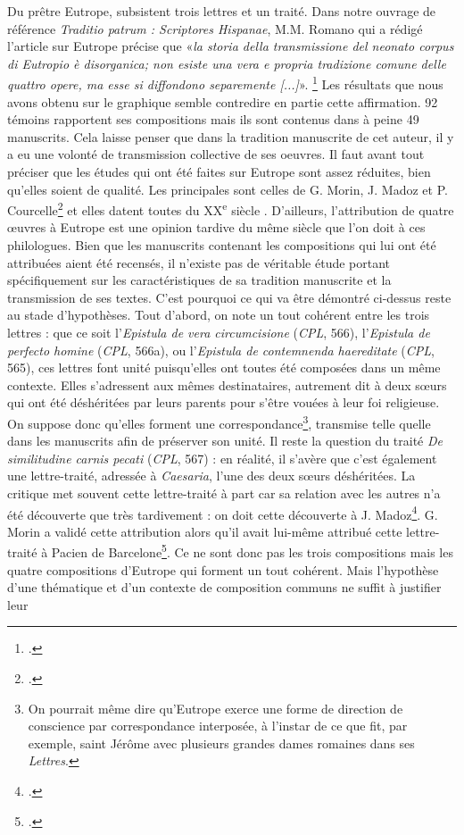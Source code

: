 \documentclass[a4paper,twoside,12pt]{book}
\begin{document}
Du prêtre Eutrope, subsistent trois lettres et un traité. Dans notre ouvrage de référence \textit{Traditio patrum : Scriptores Hispanae}, M.M. Romano qui a rédigé l’article sur Eutrope précise que «\textit{la storia della transmissione del neonato corpus di Eutropio è disorganica; non esiste una vera e propria tradizione comune delle quattro opere, ma esse si diffondono
	separemente [...]}». \footcite[p. 388]{TradPat} Les résultats que nous avons obtenu sur le graphique semble contredire en partie cette affirmation. 92 témoins rapportent ses compositions mais ils sont contenus dans à peine 49 manuscrits. Cela laisse penser que dans la tradition manuscrite de cet auteur, il y a eu une volonté de transmission collective de ses oeuvres. Il faut avant tout préciser que les études qui ont été faites sur Eutrope sont assez réduites, bien qu’elles soient de qualité.  Les principales sont
celles de G. Morin, J. Madoz et P. Courcelle\footcite{Morin, Madoz, Courcelle}
et elles datent toutes du XX\textsuperscript{e} siècle
. D’ailleurs, l’attribution de quatre œuvres à Eutrope est une opinion tardive du même siècle que l’on doit à ces philologues. Bien que les manuscrits contenant les compositions qui lui ont été attribuées aient été recensés, il n’existe pas de véritable étude portant spécifiquement sur les caractéristiques de sa tradition manuscrite et la transmission de ses textes. C’est pourquoi ce qui va être démontré ci-dessus reste au stade d’hypothèses. Tout d’abord, on note un tout cohérent entre les trois lettres : que ce soit l’\textit{Epistula de vera circumcisione} (\textit{CPL}, 566), l’\textit{Epistula de perfecto homine} (\textit{CPL}, 566a), ou l’\textit{Epistula de contemnenda haereditate} (\textit{CPL}, 565), ces lettres font unité puisqu’elles ont toutes été composées dans un même contexte. Elles s’adressent aux mêmes destinataires, autrement dit à deux sœurs qui ont été déshéritées par leurs parents pour s’être vouées à leur foi religieuse. On suppose donc qu’elles forment une correspondance\footnote{On pourrait même dire qu’Eutrope exerce une forme de direction de conscience par correspondance interposée, à l’instar de ce que fit, par exemple, saint Jérôme avec plusieurs grandes dames romaines dans ses \textit{Lettres}.}, transmise telle quelle dans les manuscrits afin de préserver son unité.  Il reste la question du traité \textit{De similitudine carnis pecati} (\textit{CPL}, 567) : en réalité, il s’avère que c’est également une lettre-traité, adressée à \textit{Caesaria}, l’une des deux sœurs déshéritées. La critique met souvent cette lettre-traité à part car sa relation avec les autres n’a été découverte que très tardivement : on doit cette découverte à J. Madoz\footcite{Madoz}. G. Morin a validé cette attribution alors qu’il avait lui-même attribué cette lettre-traité à Pacien de Barcelone\footcite[p. 31--150]{Morin}. Ce ne sont donc pas les trois compositions mais les quatre compositions d’Eutrope qui forment un tout cohérent. Mais l’hypothèse d’une thématique et d’un contexte de composition communs ne suffit à justifier leur
\end{document}
